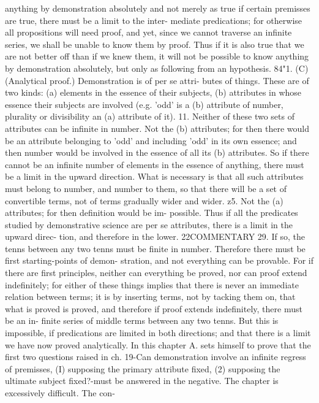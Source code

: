 {{{{{{{{{{{{{{{{{anything by demonstration absolutely and not merely as true
if certain premisses are true, there must be a limit to the inter-
mediate predications; for otherwise all propositions will need
proof, and yet, since we cannot traverse an infinite series, we shall
be unable to know them by proof. Thus if it is also true that we
are not better off than if we knew them, it will not be possible
to know anything by demonstration absolutely, but only as
following from an hypothesis.
84"1. (C) (Analytical proof.) Demonstration is of per se attri-
butes of things. These are of two kinds: (a) elements in the
essence of their subjects, (b) attributes in whose essence their
subjects are involved (e.g. 'odd' is a (b) attribute of number,
plurality or divisibility an (a) attribute of it).
11. Neither of these two sets of attributes can be infinite in
number. Not the (b) attributes; for then there would be an
attribute belonging to 'odd' and including 'odd' in its own essence;
and then number would be involved in the essence of all its (b)
attributes. So if there cannot be an infinite number of elements
in the essence of anything, there must be a limit in the upward
direction. What is necessary is that all such attributes must
belong to number, and number to them, so that there will be
a set of convertible terms, not of terms gradually wider and
wider.
z5. Not the (a) attributes; for then definition would be im-
possible. Thus if all the predicates studied by demonstrative
science are per se attributes, there is a limit in the upward direc-
tion, and therefore in the lower.
22COMMENTARY
29. If so, the tenns between any two tenns must be finite in
number. Therefore there must be first starting-points of demon-
stration, and not everything can be provable. For if there are
first principles, neither can everything be proved, nor can proof
extend indefinitely; for either of these things implies that there
is never an immediate relation between terms; it is by inserting
terms, not by tacking them on, that what is proved is proved,
and therefore if proof extends indefinitely, there must be an in-
finite series of middle terms between any two tenns. But this
is impossible, if predications are limited in both directions; and
that there is a limit we have now proved analytically.
In this chapter A. sets himself to prove that the first two
questions raised in ch. 19-Can demonstration involve an infinite
regress of premisses, (I) supposing the primary attribute fixed,
(2) supposing the ultimate subject fixed?-must be answered
in the negative. The chapter is excessively difficult. The con-
}}}}}}}}}}}}}}}}}
